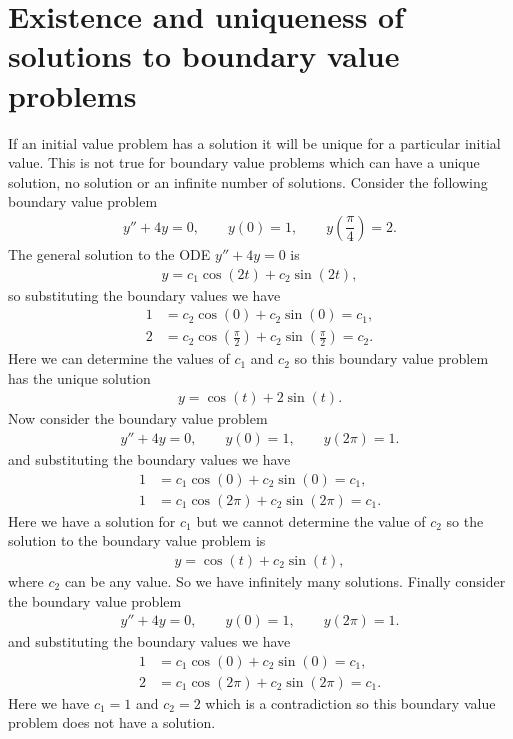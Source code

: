\documentclass[letterpaper,10pt,english]{jupyterBook}
\begin{document}
\section{Existence and uniqueness of solutions to boundary value problems}
\label{\detokenize{5_BVPs/5.0_BVPs:existence-and-uniqueness-of-solutions-to-boundary-value-problems}}\label{\detokenize{5_BVPs/5.0_BVPs:existence-and-uniqueness-of-bvp-solutions-section}}
\sphinxAtStartPar
If an initial value problem has a solution it will be unique for a particular initial value. This is not true for boundary value problems which can have a unique solution, no solution or an infinite number of solutions. Consider the following boundary value problem
\begin{align*}
    y'' + 4y = 0, \qquad y(0) = 1, \qquad y\left(\dfrac{\pi}{4}\right) = 2.
\end{align*}
\sphinxAtStartPar
The general solution to the ODE \(y'' + 4y = 0\) is
\begin{align*}
    y = c_1 \cos(2 t) + c_2 \sin(2 t),
\end{align*}
\sphinxAtStartPar
so substituting the boundary values we have
\begin{align*}
    1 &= c_2 \cos(0) + c_2 \sin(0) = c_1, \\
    2 &= c_2 \cos\left(\frac{\pi}{2}\right) + c_2 \sin\left(\frac{\pi}{2}\right) = c_2.
\end{align*}
\sphinxAtStartPar
Here we can determine the values of \(c_1\) and \(c_2\) so this boundary value problem has the unique solution
\begin{align*}
    y = \cos(t) + 2\sin(t).
\end{align*}
\sphinxAtStartPar
Now consider the boundary value problem
\begin{align*}
    y'' + 4y = 0, \qquad y(0) = 1, \qquad y(2\pi) = 1.
\end{align*}
\sphinxAtStartPar
and substituting the boundary values we have
\begin{align*}
    1 &= c_1 \cos(0) + c_2 \sin(0) = c_1, \\
    1 &= c_1 \cos(2\pi) + c_2 \sin(2\pi) = c_1.
\end{align*}
\sphinxAtStartPar
Here we have a solution for \(c_1\) but we cannot determine the value of \(c_2\) so the solution to the boundary value problem is
\begin{align*}
    y = \cos(t) + c_2 \sin(t),
\end{align*}
\sphinxAtStartPar
where \(c_2\) can be any value. So we have infinitely many solutions. Finally consider the boundary value problem
\begin{align*}
    y'' + 4y = 0, \qquad y(0) = 1, \qquad y(2\pi) = 1.
\end{align*}
\sphinxAtStartPar
and substituting the boundary values we have
\begin{align*}
    1 &= c_1 \cos(0) + c_2 \sin(0) = c_1, \\
    2 &= c_1 \cos(2\pi) + c_2 \sin(2\pi) = c_1.
\end{align*}
\sphinxAtStartPar
Here we have \(c_1 = 1\) and \(c_2 = 2\) which is a contradiction so this boundary value problem does not have a solution.
\end{document}
